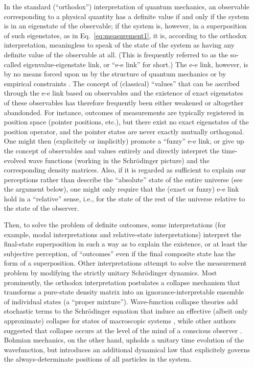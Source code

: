 \documentclass[rmp,aps,amsmath,amsfonts,noshowkeys,noshowpacs,12pt]{revtex4}
\begin{document}
In the standard (``orthodox'') interpretation of quantum mechanics, an
observable corresponding to a physical quantity has a definite value
if and only if the system is in an eigenstate of the observable; if
the system is, however, in a superposition of such eigenstates, as in
Eq.~\eqref{eq:measurement1}, it is, according to the orthodox
interpretation, meaningless to speak of the state of the system
as having any definite value of the observable at all.  (This is
frequently referred to as the so-called eigenvalue-eigenstate
link, or ``{e-e} link'' for short.) The {e-e} link, however, is by
no means forced upon us by the structure of quantum mechanics or by
empirical constraints \citep{Bub:1997:iq}.  The concept of (classical)
``values'' that can be ascribed through the e-e link based on
observables and the existence of exact eigenstates of these
observables has therefore frequently been either weakened or
altogether abandonded.  For instance, outcomes of measurements are
typically registered in position space (pointer positions, etc.), but
there exist no exact eigenstates of the position operator, and the
pointer states are never exactly mutually orthogonal. One might then
(explicitely or implicitly) promote a ``fuzzy'' e-e link, or give up
the concept of observables and values entirely and directly interpret
the time-evolved wave functions (working in the Schr\"odinger picture)
and the corresponding density matrices.  Also, if it is regarded as
sufficient to explain our perceptions rather than describe the
``absolute'' state of the entire universe (see the argument below),
one might only require that the (exact or fuzzy) e-e link hold in a
``relative'' sense, i.e., for the state of the rest of the universe
relative to the state of the observer.

Then, to solve the problem of definite outcomes, some interpretations
(for example, modal interpretations and relative-state
interpretations) interpret the final-state superposition in such a way
as to explain the existence, or at least the subjective perception, of
``outcomes'' even if the final composite state has the form of a
superposition. Other interpretations attempt to solve the measurement
problem by modifying the strictly unitary Schr\"odinger dynamics. Most
prominently, the orthodox interpretation postulates a collapse
mechanism that transforms a pure-state density matrix into an
ignorance-interpretable ensemble of individual states (a ``proper
mixture'').  Wave-function collapse theories add stochastic terms to
the Schr\"odinger equation that induce an effective (albeit only
approximate) collapse for states of macroscopic systems
\citep{Pearle:1979:rq,Gisin:1984:qs,Ghirardi:1986:ud,Pearle:1999:cr},
while other authors suggested that collapse occurs at the level of the
mind of a conscious observer \citep{Wigner:1963:yt,Stapp:1993:mm}.
Bohmian mechanics, on the other hand, upholds a unitary time evolution
of the wavefunction, but introduces an additional dynamical law that
explicitely governs the always-determinate positions of all particles
in the system.
\end{document}
